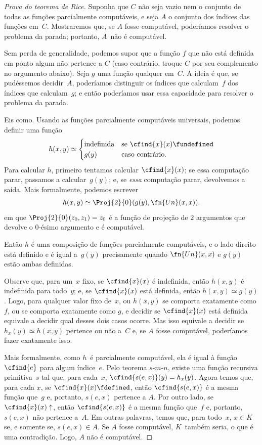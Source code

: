 \documentclass[../../../include/open-logic-section]{subfiles}
\begin{document}
\begin{proof}[Prova do teorema de Rice]
Suponha que $C$ não seja vazio nem o conjunto de todas as funções
parcialmente computáveis, e seja $A$ o conjunto dos índices das funções
em~$C$. Mostraremos que, se $A$ fosse computável, poderíamos resolver
o problema da parada; portanto, $A$~não é computável.

Sem perda de generalidade, podemos supor que a função $f$ que não está
definida em ponto algum não pertence a $C$ (caso contrário, troque $C$
por seu complemento no argumento abaixo). Seja $g$ uma função qualquer
em~$C$. A ideia é que, se pudéssemos decidir~$A$, poderíamos distinguir
os índices que calculam~$f$ dos índices que calculam~$g$; e então
poderíamos usar essa capacidade para resolver o problema da parada.

Eis como. Usando as funções parcialmente computáveis universais,
podemos definir uma função
\[
h(x,y) \simeq
\begin{cases}
\text{indefinida} & \text{se $\cfind{x}(x) \fundefined$} \\
g(y) & \text{caso contrário.}
\end{cases}
\]
Para calcular $h$, primeiro tentamos calcular $\cfind{x}(x)$; se essa
computação parar, passamos a calcular~$g(y)$; e, se {\em essa}
computação parar, devolvemos a saída. Mais formalmente, podemos escrever
\[
h(x,y) \simeq \Proj{2}{0}(g(y),\fn{Un}(x,x)).
\]
em que $\Proj{2}{0}(z_0, z_1) = z_0$ é a função de projeção de
$2$ argumentos que devolve o $0$-ésimo argumento e é computável.

Então $h$ é uma composição de funções parcialmente computáveis, e o
lado direito está definido e é igual a~$g(y)$ precisamente quando
$\fn{Un}(x,x)$ e $g(y)$ estão ambas definidas.

Observe que, para um~$x$ fixo, se $\cfind{x}(x)$ é indefinida, então
$h(x,y)$ é indefinida para todo~$y$; e, se $\cfind{x}(x)$ está
definida, então $h(x,y) \simeq g(y)$. Logo, para qualquer valor fixo
de~$x$, ou $h(x,y)$ se comporta exatamente como $f$, ou se comporta
exatamente como $g$, e decidir se $\cfind{x}(x)$ está definida equivale
a decidir qual desses dois casos ocorre. Mas isso equivale a decidir
se $h_x(y) \simeq h(x,y)$ pertence ou não a~$C$ e, se $A$ fosse
computável, poderíamos fazer exatamente isso.

Mais formalmente, como $h$~é parcialmente computável, ela é igual à
função $\cfind{e}$ para algum índice~$e$. Pelo teorema $s$-$m$-$n$,
existe uma função recursiva primitiva~$s$ tal que, para cada~$x$,
$\cfind{s(e,x)}(y) = h_x(y)$. Agora temos que, para cada $x$, se
$\cfind{x}(x) \fdefined$, então $\cfind{s(e,x)}$ é a mesma função
que~$g$ e, portanto, $s(e,x)$ pertence a $A$. Por outro lado, se
$\cfind{x}(x) \uparrow$, então $\cfind{s(e,x)}$ é a mesma função
que~$f$ e, portanto, $s(e,x)$ não pertence a~$A$. Em outras palavras,
temos que, para todo~$x$, $x \in K$ se, e somente se,
$s(e,x) \in A$. Se $A$ fosse computável, $K$~também seria, o que é uma
contradição. Logo, $A$ não é computável.
\end{proof}
\end{document}
